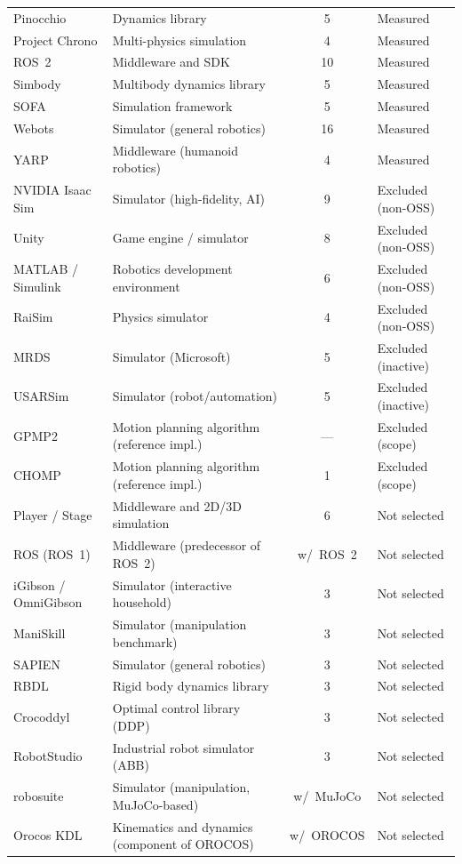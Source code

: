 \begin{singlespace}
\begin{longtable}{@{}p{3.7cm}p{4.6cm}cp{2.9cm}@{}}
Pinocchio & Dynamics library & 5 & Measured \\
Project Chrono & Multi-physics simulation & 4 & Measured \\
ROS~2 & Middleware and SDK & 10 & Measured \\
Simbody & Multibody dynamics library & 5 & Measured \\
SOFA & Simulation framework & 5 & Measured \\
Webots & Simulator (general robotics) & 16 & Measured \\
YARP & Middleware (humanoid robotics) & 4 & Measured \\
\midrule
NVIDIA Isaac Sim & Simulator (high-fidelity, AI) & 9 & Excluded (non-OSS) \\
Unity & Game engine / simulator & 8 & Excluded (non-OSS) \\
MATLAB / Simulink & Robotics development environment & 6 & Excluded (non-OSS) \\
RaiSim & Physics simulator & 4 & Excluded (non-OSS) \\
MRDS & Simulator (Microsoft) & 5 & Excluded (inactive) \\
USARSim & Simulator (robot/automation) & 5 & Excluded (inactive) \\
GPMP2 & Motion planning algorithm (reference impl.) & --- & Excluded (scope) \\
CHOMP & Motion planning algorithm (reference impl.) & 1 & Excluded (scope) \\
\midrule
Player / Stage & Middleware and 2D/3D simulation & 6 & Not selected \\
ROS (ROS~1) & Middleware (predecessor of ROS~2) & w/~ROS~2 & Not selected \\
iGibson / OmniGibson & Simulator (interactive household) & 3 & Not selected \\
ManiSkill & Simulator (manipulation benchmark) & 3 & Not selected \\
SAPIEN & Simulator (general robotics) & 3 & Not selected \\
RBDL & Rigid body dynamics library & 3 & Not selected \\
Crocoddyl & Optimal control library (DDP) & 3 & Not selected \\
RobotStudio & Industrial robot simulator (ABB) & 3 & Not selected \\
robosuite & Simulator (manipulation, MuJoCo-based) & w/~MuJoCo & Not selected \\
Orocos KDL & Kinematics and dynamics (component of OROCOS) & w/~OROCOS & Not selected \\

\end{longtable}
\end{singlespace}

